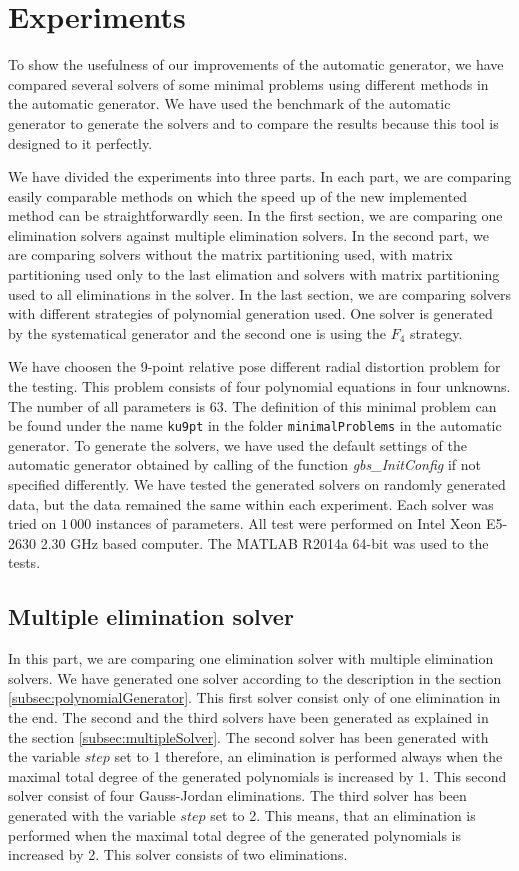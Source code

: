 \chapter{Experiments}
To show the usefulness of our improvements of the automatic generator, we have compared several solvers of some minimal problems using different methods in the automatic generator. We have used the benchmark of the automatic generator to generate the solvers and to compare the results because this tool is designed to it perfectly.

We have divided the experiments into three parts. In each part, we are comparing easily comparable methods on which the speed up of the new implemented method can be straightforwardly seen. In the first section, we are comparing one elimination solvers against multiple elimination solvers. In the second part, we are comparing solvers without the matrix partitioning used, with matrix partitioning used only to the last elimation and solvers with matrix partitioning used to all eliminations in the solver. In the last section, we are comparing solvers with different strategies of polynomial generation used. One solver is generated by the systematical generator and the second one is using the $F_4$ strategy.

We have choosen the 9-point relative pose different radial distortion problem \cite{9pt} for the testing. This problem consists of four polynomial equations in four unknowns. The number of all parameters is 63. The definition of this minimal problem can be found under the name \texttt{ku9pt} in the folder \texttt{minimalProblems} in the automatic generator. To generate the solvers, we have used the default settings of the automatic generator obtained by calling of the function \textit{gbs\_InitConfig} if not specified differently. We have tested the generated solvers on randomly generated data, but the data remained the same within each experiment. Each solver was tried on $1\,000$ instances of parameters. All test were performed on Intel Xeon E5-2630 2.30 GHz based computer. The MATLAB R2014a 64-bit was used to the tests.

\section{Multiple elimination solver}
In this part, we are comparing one elimination solver with multiple elimination solvers. We have generated one solver according to the description in the section \ref{subsec:polynomialGenerator}. This first solver consist only of one elimination in the end. The second and the third solvers have been generated as explained in the section \ref{subsec:multipleSolver}. The second solver has been generated with the variable $step$ set to 1 therefore, an elimination is performed always when the maximal total degree of the generated polynomials is increased by 1. This second solver consist of four Gauss-Jordan eliminations. The third solver has been generated with the variable $step$ set to 2. This means, that an elimination is performed when the maximal total degree of the generated polynomials is increased by 2. This solver consists of two eliminations.

